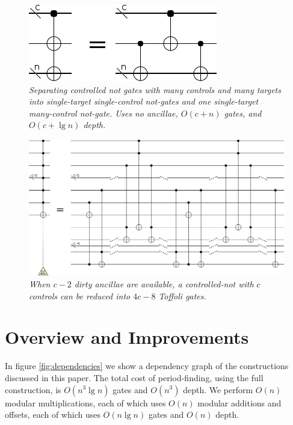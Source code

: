 \documentclass[twocolumn]{article}
\begin{document}
\begin{figure}
  \centering
  \includegraphics[width=\linewidth]{assets/multi-cnot-to-single-cnots.png}
  \caption{\em
    Separating controlled not gates with many controls and many targets into single-target single-control not-gates and one single-target many-control not-gate.
    Uses no ancillae, $O(c + n)$ gates, and $O(c + \lg n)$ depth.
  }
  \label{fig:multi-not}
\end{figure}

\begin{figure}
  \centering
  \includegraphics[width=\linewidth]{assets/cnot-reduction.png}
  \caption{\em
    When $c-2$ dirty ancillae are available, a controlled-not with $c$ controls can be reduced into $4c - 8$ Toffoli gates.
  }
  \label{fig:cnot-reduction}
\end{figure}

\section{Overview and Improvements} \label{sec:costs}

In figure \ref{fig:dependencies} we show a dependency graph of the constructions discussed in this paper.
The total cost of period-finding, using the full construction, is $O(n^3 \lg n)$ gates and $O(n^3)$ depth.
We perform $O(n)$ modular multiplications, each of which uses $O(n)$ modular additions and offsets, each of which uses $O(n \lg n)$ gates \cite{haner2016} and $O(n)$ depth.
\end{document}
